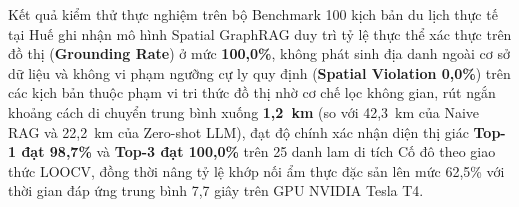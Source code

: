 Kết quả kiểm thử thực nghiệm trên bộ Benchmark 100 kịch bản du lịch thực tế tại Huế ghi nhận mô hình Spatial GraphRAG duy trì tỷ lệ thực thể xác thực trên đồ thị (\textbf{Grounding Rate}) ở mức \textbf{100,0\%}, không phát sinh địa danh ngoài cơ sở dữ liệu và không vi phạm ngưỡng cự ly quy định (\textbf{Spatial Violation 0,0\%}) trên các kịch bản thuộc phạm vi tri thức đồ thị nhờ cơ chế lọc không gian, rút ngắn khoảng cách di chuyển trung bình xuống \textbf{1,2~km} (so với 42,3~km của Naive RAG và 22,2~km của Zero-shot LLM), đạt độ chính xác nhận diện thị giác \textbf{Top-1 đạt 98,7\%} và \textbf{Top-3 đạt 100,0\%} trên 25 danh lam di tích Cố đô theo giao thức LOOCV, đồng thời nâng tỷ lệ khớp nối ẩm thực đặc sản lên mức 62,5\% với thời gian đáp ứng trung bình 7,7 giây trên GPU NVIDIA Tesla T4.
\endgroup
